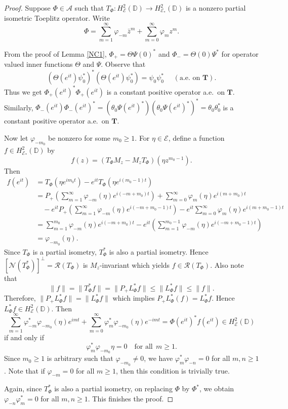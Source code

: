 \documentclass[10pt,a4paper]{amsart}
\let\phi=\varphi
\newcommand{\D}{\mathbb{D}}
\newcommand{\T}{\bm{T}}
\newcommand{\cla}{\mathcal{A}}
\newcommand{\cle}{\mathcal{E}}
\newcommand{\cln}{\mathcal{N}}
\newcommand{\clr}{\mathcal{R}}
\begin{document}
\begin{proof}
Suppose $\Phi \in \cla$ such that $T_\Phi: H^2_\cle(\D) \rightarrow H^2_{\cle_*}(\D)$ is a nonzero partial isometric Toeplitz operator.
Write
\begin{equation}\label{eq 6}
\Phi= \sum\limits_{m=1}^\infty  \phi_{-m}\bar{z}^m +\sum\limits_{m=0}^\infty \phi_mz^{m}.
\end{equation}


From the proof of Lemma \ref{NC1}, $\Phi_+=\Theta\Psi(0)^*$ and $\Phi_-=\Theta(0)\Psi^*$ for operator valued inner functions $\Theta$ and $\Psi$. Observe that
\[
(\Theta(e^{it}) \psi_0^*)^*(\Theta(e^{it}) \psi_0^*)=\psi_0\psi_0^* \,\, \quad(\text{a.e.\ on } \T).
\]
Thus we get $\Phi_+(e^{it})^*\Phi_+(e^{it}) $ is a constant positive operator a.e.\ on $\T$. Similarly,  $\Phi_-(e^{it})\Phi_-(e^{it})^*=(\theta_0 \Psi(e^{it})^*)(\theta_0 \Psi(e^{it})^*)^* = \theta_0 \theta_0^*$ is a constant positive operator a.e.\ on 
$\T$. 

Now let $\phi_{-m_0}$ be nonzero for some $m_0 \geq 1$. For $\eta \in \cle$, define a function $f\in H^2_{\cle_*}(\D)$ by 
\[
f(z)=(T_\Phi M_z-M_zT_\Phi)\left(\eta z^{m_0-1}\right).
\]
Then 
\begin{align*}
f(e^{it})&=T_\Phi(\eta e^{im_0t})-e^{it}T_\Phi(\eta e^{i(m_0-1)t})\\
&=P_+\left(\sum\limits_{m=1}^\infty \phi_{-m}(\eta)e^{i(-m+m_0)t}\right)+\sum\limits_{m=0}^\infty \phi_m(\eta)e^{i(m+m_0)t} \\
& \quad -e^{it}P_+\left(\sum\limits_{m=1}^\infty \phi_{-m}(\eta)e^{i(-m+m_0-1)t}\right) - e^{it}\sum\limits_{m=0}^\infty \phi_{m}(\eta)e^{i(m+m_0-1)t}\\
&=\sum\limits_{m=1}^{m_0} \phi_{-m}(\eta)e^{i(-m+m_0)t}-e^{it}\left(\sum\limits_{m=1}^{m_0-1}\phi_{-m}(\eta)e^{i(-m+m_0-1)t}\right)\\
&=\phi_{-m_0}(\eta).
\end{align*}
Since $T_\Phi$ is a partial isometry, $T_\Phi^*$  is also a partial isometry. 
Hence $[\cln(T_\Phi^*)]^\perp=\clr(T_\Phi)$ is $M_z$-invariant which yields $f \in \clr(T_\Phi)$.
Also note that 
\[
\|f\|=\|T_\Phi^*f\|=\|P_+L_\Phi ^*f\|\leq \|L_\Phi^* f \|\leq \|f\|.
\]
Therefore, $\|P_+L_\Phi ^*f \|=\|L_\Phi^* f \|$ which implies $P_+ L_\Phi^* (f)=L_\Phi^*f$. Hence $L_\Phi^* f \in H^2_\cle(\D)$. Then
\[
\sum\limits_{m=1}^\infty \phi_{-m}^*\phi_{-m_0}(\eta)e^{imt}+\sum\limits_{m=0}^\infty \phi_m^*\phi_{-m_0}(\eta)e^{-imt} = \Phi(e^{it})^*f(e^{it})\in H^2_\cle(\D)
\]
if and only if 
\[
\phi_m^*\phi_{-m_0}\eta=0 \quad \mbox{for all} ~~ m \geq 1.
\]
Since $m_0 \geq 1$ is arbitrary such that $\phi_{-m_0} \neq 0$, we have $\phi_m^*\phi_{-n}=0 $ for all $m,n \geq 1$. Note that if $\phi_{-m}=0$ for all $m \geq 1$, then this condition is trivially true. 

Again, since $T_\Phi^*$ is also a partial isometry, on replacing $\Phi$ by $\Phi^*$, we obtain $\phi_{-n}\phi_m^*=0$ for all $m ,n \geq 1$. This finishes the proof.
\end{proof}
\end{document}
